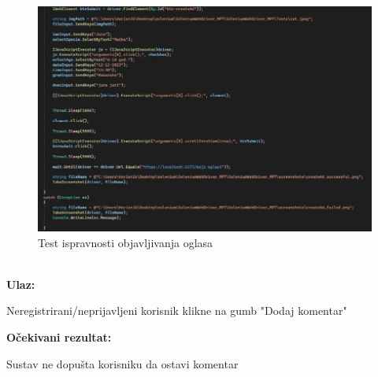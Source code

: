 			\begin{figure}[H]
				\includegraphics[width=\textwidth]{2test_postad_2.JPEG}
				\centering
				\caption{Test ispravnosti objavljivanja oglasa}
				\label{fig:testpostad2}
			\end{figure}
			
			\noindent {}\\
			\textbf{Ulaz: }	
			\begin{packed_enum}
				\item Neregistrirani/neprijavljeni korisnik klikne na gumb "Dodaj komentar"
				
			\end{packed_enum}
			
			\noindent \textbf{Očekivani rezultat:}
			
			\begin{packed_enum}
				\item Sustav ne dopušta korisniku da ostavi komentar
				
			\end{packed_enum}
			

